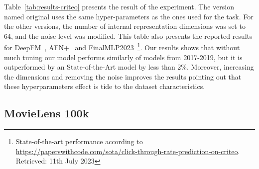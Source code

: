 \documentclass[manuscript,nonacm]{acmart}
\begin{document}
\begin{table}
    \centering
    \caption{Results obtained for the evaluated models for the Criteo dataset.}
    \label{tab:results-criteo}\vspace{-1.0cm}
\end{table}

Table~\ref{tab:results-criteo} presents the result of the experiment. The version named original uses the same hyper-parameters as the ones used for the task. For the other versions, the number of internal representation dimensions was set to 64, and the noise level was modified. This table also presents the reported results for DeepFM~\cite{deepfm17}, AFN+~\cite{afn_criteo} and FinalMLP2023~\cite{FinalMLP2023}\footnote{State-of-the-art performance according to \url{https://paperswithcode.com/sota/click-through-rate-prediction-on-criteo}. Retrieved: 11th July 2023}. Our results shows that without much tuning our model performs similarly of models from 2017-2019, but it is outperformed by an State-of-the-Art model by less than 2\%. Moreover, increasing the dimensions and removing the noise improves the results pointing out that these hyperparameters effect is tide to the dataset characteristics. 

\subsection{MovieLens 100k}
\end{document}
